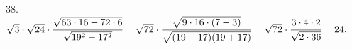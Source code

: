 38. $\sqrt{3}\cdot\sqrt{24}\cdot\cfrac{\sqrt{63\cdot16-72\cdot6}}{\sqrt{19^2-17^2}}=
\sqrt{72}\cdot\cfrac{\sqrt{9\cdot16\cdot(7-3)}}{\sqrt{(19-17)(19+17)}}=\sqrt{72}\cdot\cfrac{3\cdot4\cdot2}{\sqrt{2\cdot36}}=24.$\\
